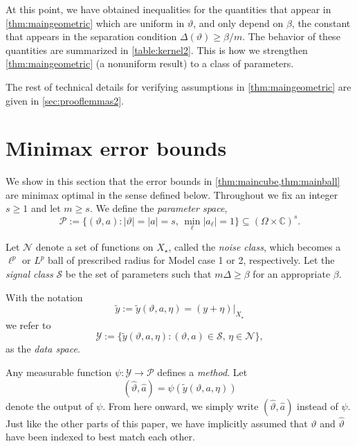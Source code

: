 \documentclass[11pt]{article}
\theoremstyle{definition}
\numberwithin{theorem}{section}
\numberwithin{lemma}{section}
\numberwithin{equation}{section}
\def\C{\mathbb{C}}
\renewcommand{\subset}{\subseteq}
\renewcommand{\hat}{\widehat}
\renewcommand{\tilde}{\widetilde}
\newcommand{\bfa}{a}
\newcommand{\calS}{\mathcal{S}}
\newcommand{\calN}{\mathcal{N}}
\newcommand{\calP}{\mathcal{P}}
\newcommand{\calY}{\mathcal{Y}}
\numberwithin{equation}{section}
\begin{document}
	At this point, we have obtained inequalities for the quantities that appear in \cref{thm:maingeometric} which are uniform in $\vartheta$, and only depend on $\beta$, the constant that appears in the separation condition $\Delta(\vartheta)\geq \beta/m$. The behavior of these quantities are summarized in \cref{table:kernel2}. This is how we strengthen \cref{thm:maingeometric} (a nonuniform result) to a class of parameters. 
	
The rest of technical details for verifying assumptions in \cref{thm:maingeometric} are given in \cref{sec:prooflemmas2}. 

	\section{Minimax error bounds}
	\label{sec:minimax}
	
We show in 	this section  that the error bounds in \cref{thm:maincube,thm:mainball} are minimax optimal in the sense defined below. Throughout we fix an integer $s\geq 1$ and let $m\geq s$. We define the {\it parameter space},
	\begin{equation}
		\label{eq:parameterspace}
		\calP:= \big\{(\vartheta,\bfa)\colon |\vartheta|=|\bfa|=s, \, \min_\ell |a_\ell|=1 \big\}\subset (\Omega\times \C)^s. 
	\end{equation}
	
	Let $\calN$ denote a set of functions on $X_\star$, called  the {\it noise class},  which becomes a $\ell^p$ or $L^p$ ball of prescribed radius for Model case 1 or 2, respectively. Let the {\it signal class} $\calS$ be the set of parameters such that $m\Delta\geq \beta$ for an appropriate $\beta$. 

With the notation
	\begin{equation}
		\label{eq:information}
		\tilde y:=\tilde y(\vartheta,\bfa,\eta) = (y+\eta)|_{X_\star}
	\end{equation}	
 we refer to 
 $$
	\calY:=\{\tilde y(\vartheta,\bfa,\eta)\colon (\vartheta,\bfa)\in\calS, \, \eta\in\calN\},
	$$
	as the {\it data space}. 
	
	
	Any measurable function $\psi: \calY\to\calP$ defines a {\it method}. Let
	$$
	(\hat\vartheta,\hat\bfa)=\psi(\tilde y(\vartheta,\bfa,\eta))
	$$ 
	denote the output of $\psi$. From here onward, we simply write $(\hat\vartheta,\hat\bfa)$ instead of $\psi$. Just like the other parts of this paper, we have implicitly assumed that $\vartheta$ and $\hat\vartheta$ have been indexed to best match each other. 
	
\end{document}
